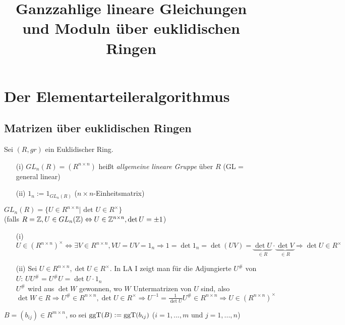 \documentclass[a4paper,DIV15,BCOR12mm]{article}
\title{Ganzzahlige lineare Gleichungen und Moduln über euklidischen Ringen}
\begin{document}
\maketitle
\section{Der Elementarteileralgorithmus}
\subsection{Matrizen über euklidischen Ringen} Sei $(R, gr)$
ein Euklidischer Ring.
\begin{definition}
    \begin{itemize}
        \item[(i)] $GL_n(R) = (R^{n \times n})$ heißt \emph{allgemeine lineare Gruppe} über $R$ (GL = general linear)
        \item[(ii)] $1_n := 1_{GL_n(R)}$ ($n \times n$-Einheitsmatrix)
    \end{itemize}
\end{definition}
\begin{lemma}
    $GL_n(R) = \{U \in R^{n \times n} \big| \text{ det } U \in R^\times\}$\\
    (falls $R = \mathbb{Z}, U \in GL_n(\mathbb{Z}) \Leftrightarrow U \in \mathbb{Z}^{n \times n}, \det U = \pm 1$)
\end{lemma}
\begin{beweis}
    \begin{itemize}
        \item[(i)] $U \in (R^{n \times n})^\times \Leftrightarrow \exists V \in R^{n \times n}, VU = UV = 1_n \Rightarrow 1 = \det 1_n = \det (UV) = \underbrace{\det U}_{\in R} \cdot \underbrace{\det V}_{\in R} \Rightarrow \det U \in R^\times$
        \item[(ii)] Sei $U \in R^{n \times n}, \det U \in R^\times$. In LA I zeigt man für die Adjungierte $U^\#$ von $U$: $UU^\# = U^\#U = \det U \cdot 1_n$\\
            $U^\#$ wird aus $\det W$ gewonnen, wo $W$ Untermatrizen von $U$ sind, also $\det W \in R \Rightarrow U^\# \in R^{n \times n}, \det U \in R^\times \Rightarrow U^{-1} = \frac{1}{\det U}U^\# \in R^{n \times n} \Rightarrow U \in (R^{n \times n})^\times$
    \end{itemize}
\end{beweis}
\begin{definition}
    $B = (b_{ij}) \in R^{m \times n}$, so sei $\mathop{\rm ggT}\nolimits(B) := \mathop{\rm ggT}\nolimits(b_{ij})$ ($i = 1,...,m$ und $j = 1,...,n$)
\end{definition}
\end{document}
